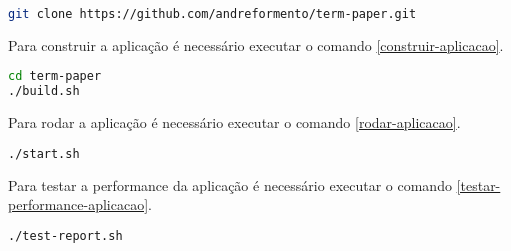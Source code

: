 \begin{lstlisting}[language=bash,label=comando-git,caption=Como fazer o download do código fonte com o Git]
git clone https://github.com/andreformento/term-paper.git
\end{lstlisting}

Para construir a aplicação é necessário executar o comando
\autoref{construir-aplicacao}.

\begin{lstlisting}[language=bash,label=construir-aplicacao,caption=Como construir a aplicação]
cd term-paper
./build.sh
\end{lstlisting}

Para rodar a aplicação é necessário executar o comando
\autoref{rodar-aplicacao}.

\begin{lstlisting}[language=bash,label=rodar-aplicacao,caption=Como rodar a aplicação]
./start.sh
\end{lstlisting}

Para testar a performance da aplicação é necessário executar o comando
\autoref{testar-performance-aplicacao}.

\begin{lstlisting}[language=bash,label=testar-performance-aplicacao,caption=Como testar a performance da aplicação]
./test-report.sh
\end{lstlisting}





